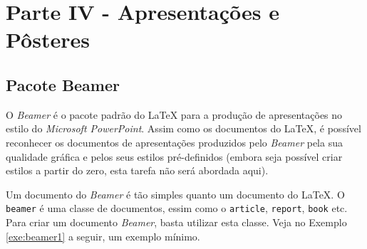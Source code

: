\chapter{Parte IV - Apresentações e Pôsteres}
\label{cap:parteIV}

\section{Pacote Beamer}
\label{sec:beamer}

O \textit{Beamer} é o pacote padrão do \LaTeX{} para a produção de apresentações no estilo do \textit{Microsoft PowerPoint}. Assim como os documentos do \LaTeX{}, é possível reconhecer os documentos de apresentações produzidos pelo \textit{Beamer} pela sua qualidade gráfica e pelos seus estilos pré-definidos (embora seja possível criar estilos a partir do zero, esta tarefa não será abordada aqui).

Um documento do \textit{Beamer} é tão simples quanto um documento do \LaTeX{}. O {\tt beamer} é uma classe de documentos, essim como o {\tt article}, {\tt report}, {\tt book} etc. Para criar um documento \textit{Beamer}, basta utilizar esta classe. Veja no Exemplo \ref{exe:beamer1} a seguir, um exemplo mínimo.


